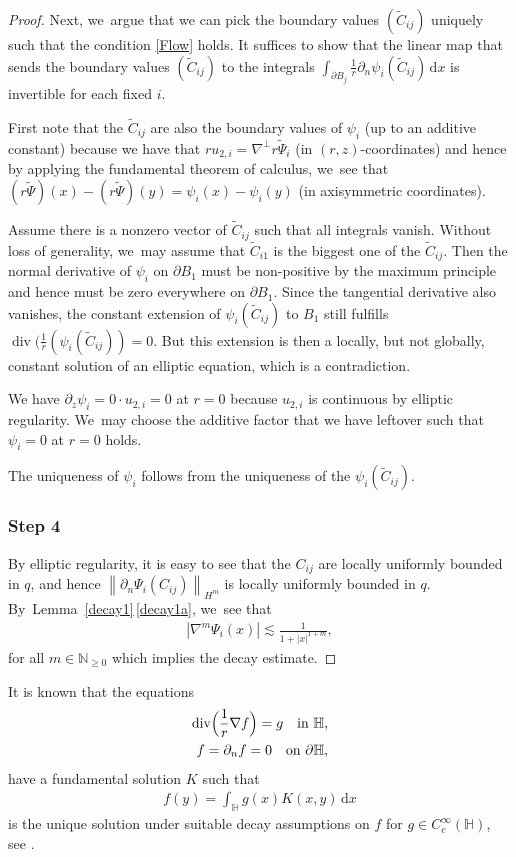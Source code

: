 \documentclass[10pt]{amsart}
\theoremstyle{definition}
\renewcommand{\div}{\operatorname{div}}
\newcommand\N{\mathbb{N}}
\newcommand\norm[1]{\left\lVert #1\right\rVert}
\newcommand\eq{=}
\newcommand\dd{\,\mathrm{d}}
\newcommand\dx{\dd x}
\let\de\partial
\begin{document}
\begin{proof}
Next, we~argue that we can pick the boundary values $(\tilde{C}_{ij})$ uniquely such that the condition \eqref{Flow} holds. It suffices to show that the linear map that sends the boundary values $(\tilde{C}_{ij})$ to the integrals $\int_{\de B_j}\frac{1}{r}\de_{n}\psi_i(\tilde{C}_{ij})\dx$ is invertible for each fixed $i$.

First note that the $\tilde{C}_{ij}$ are also the boundary values of $\psi_i$ (up to an additive constant) because we have that $ru_{2,i}=\nabla^\perp r\tilde{\Psi}_i$ (in $(r,z)$-coordinates) and hence by applying the fundamental theorem of calculus, we~see that $(r\tilde{\Psi})(x)-(r\tilde{\Psi})(y)=\psi_i(x)-\psi_i(y)$ (in axisymmetric coordinates).

Assume there is a nonzero vector of $\tilde{C}_{ij}$ such that all integrals vanish. Without loss of generality, we~may assume that $\tilde{C}_{i1}$ is the biggest one of the $\tilde{C}_{ij}$. Then the normal derivative of $\psi_i$ on $\de B_1$ must be non-positive by the maximum principle and hence must be zero everywhere on $\de B_1$. Since the tangential derivative also vanishes, the constant extension of $\psi_i(\tilde{C}_{ij})$ to $B_1$ still fulfills $\div(\frac{1}{r}(\psi_i(\tilde{C}_{ij}))=0$. But this extension is then a locally, but not globally, constant solution of an elliptic equation, which is a contradiction.

We have $\de_z\psi_i=0\cdot u_{2,i}=0$ at $r=0$ because $u_{2,i}$ is continuous by elliptic regularity. We~may choose the additive factor that we have leftover such that $\psi_i=0$ at $r=0$ holds.

The uniqueness of $\psi_i$ follows from the uniqueness of the $\psi_i(\tilde{C}_{ij})$.

\subsubsection*{Step 4} By elliptic regularity, it is easy to see that the $C_{ij}$ are locally uniformly bounded in $q$, and hence $\norm{\de_n\Psi_i(C_{ij})}_{H^m}$ is locally uniformly bounded in $q$. By~Lem\-ma~\ref{decay1}\,\eqref{decay1a}, we~see that
\begin{align*}|\nabla^m\Psi_i(x)|\lesssim \frac{1}{1+|x|^{1+m}},
\end{align*}
for all $m\in \N_{\geq 0}$ which implies the decay estimate.
\end{proof}

It is known that the equations
\begin{align*}
\div\Bigl(\frac{1}{r}\nabla f\Bigr)\eq g\quad\text{in $\mathbb{H}$},\\
f\eq\de_nf\eq 0\quad\text{on $\de\mathbb{H}$},
\end{align*}
have a fundamental solution $K$ such that
\begin{align}\label{definition K}
f(y)\eq \int_{\mathbb{H}}g(x)K(x,y)\dx
\end{align}
is the unique solution under suitable decay assumptions on $f$ for \eg $g\in C_c^\infty(\mathbb{H})$, see \eg \cite[\S 2]{GallaySverak}.
\end{document}

